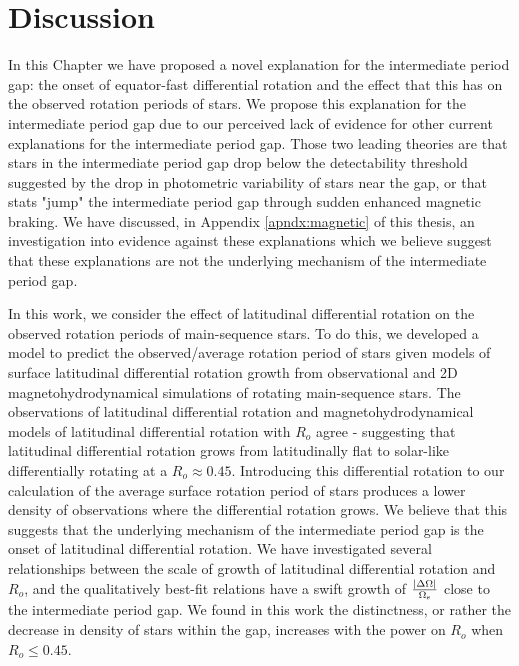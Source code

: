 \section{Discussion}
\label{sec:discussion}

In this Chapter we have proposed a novel explanation for the intermediate period gap: the onset of equator-fast differential rotation and the effect that this has on the observed rotation periods of stars.
We propose this explanation for the intermediate period gap due to our perceived lack of evidence for other current explanations for the intermediate period gap.
Those two leading theories are that stars in the intermediate period gap drop below the detectability threshold suggested by the drop in photometric variability of stars near the gap, or that stats "jump" the intermediate period gap through sudden enhanced magnetic braking.
We have discussed, in Appendix \ref{apndx:magnetic} of this thesis, an investigation into evidence against these explanations which we believe suggest that these explanations are not the underlying mechanism of the intermediate period gap.

In this work, we consider the effect of latitudinal differential rotation on the observed rotation periods of main-sequence stars.
To do this, we developed a model to predict the observed/average rotation period of stars given models of surface latitudinal differential rotation growth from observational and 2D magnetohydrodynamical simulations of rotating main-sequence stars.
The observations of latitudinal differential rotation and magnetohydrodynamical models of latitudinal differential rotation with $R_o$ agree - suggesting that latitudinal differential rotation grows from latitudinally flat to solar-like differentially rotating at a $R_o \approx 0.45$.
Introducing this differential rotation to our calculation of the average surface rotation period of stars produces a lower density of observations where the differential rotation grows.
We believe that this suggests that the underlying mechanism of the intermediate period gap is the onset of latitudinal differential rotation.
We have investigated several relationships between the scale of growth of latitudinal differential rotation and $R_o$, and the qualitatively best-fit relations have a swift growth of $\frac{|\Delta\Omega|}{\Omega_{\rm{s}}}$ close to the intermediate period gap.
We found in this work the distinctness, or rather the decrease in density of stars within the gap, increases with the power on $R_o$ when $R_o \leq 0.45$.

